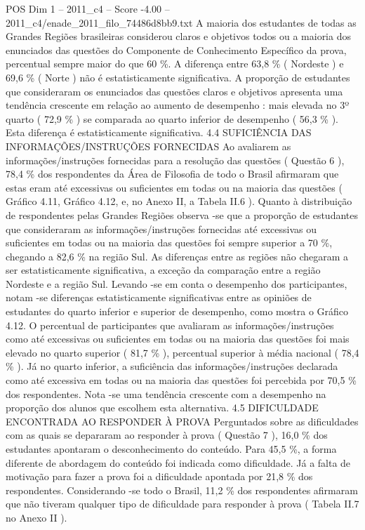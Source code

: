 \begin{textsample}{POS Dim 1 – 2011\_c4 – Score -4.00 – 2011\_c4/enade\_2011\_filo\_74486d8bb9.txt}
A maioria dos estudantes de todas as Grandes Regiões brasileiras considerou claros e objetivos todos ou a maioria dos enunciados das questões do Componente de Conhecimento Específico da prova, percentual sempre maior do que 60 \%.
A diferença entre 63,8 \% ( Nordeste ) e 69,6 \% ( Norte ) não é estatisticamente significativa.
A proporção de estudantes que consideraram os enunciados das questões claros e objetivos apresenta uma tendência crescente em relação ao aumento de desempenho : mais elevada no 3º quarto ( 72,9 \% ) se comparada ao quarto inferior de desempenho ( 56,3 \% ).
Esta diferença é estatisticamente significativa. 4.4 SUFICIÊNCIA DAS INFORMAÇÕES/INSTRUÇÕES FORNECIDAS Ao avaliarem as informações/instruções fornecidas para a resolução das questões ( Questão 6 ), 78,4 \% dos respondentes da Área de Filosofia de todo o Brasil afirmaram que estas eram até excessivas ou suficientes em todas ou na maioria das questões ( Gráfico 4.11, Gráfico 4.12, e, no Anexo II, a Tabela II.6 ).
Quanto à distribuição de respondentes pelas Grandes Regiões observa -se que a proporção de estudantes que consideraram as informações/instruções fornecidas até excessivas ou suficientes em todas ou na maioria das questões foi sempre superior a 70 \%, chegando a 82,6 \% na região Sul.
As diferenças entre as regiões não chegaram a ser estatisticamente significativa, a exceção da comparação entre a região Nordeste e a região Sul.
Levando -se em conta o desempenho dos participantes, notam -se diferenças estatisticamente significativas entre as opiniões de estudantes do quarto inferior e superior de desempenho, como mostra o Gráfico 4.12.
O percentual de participantes que avaliaram as informações/instruções como até excessivas ou suficientes em todas ou na maioria das questões foi mais elevado no quarto superior ( 81,7 \% ), percentual superior à média nacional ( 78,4 \% ).
Já no quarto inferior, a suficiência das informações/instruções declarada como até excessiva em todas ou na maioria das questões foi percebida por 70,5 \% dos respondentes.
Nota -se uma tendência crescente com a desempenho na proporção dos alunos que escolhem esta alternativa. 4.5 DIFICULDADE ENCONTRADA AO RESPONDER À PROVA Perguntados sobre as dificuldades com as quais se depararam ao responder à prova ( Questão 7 ), 16,0 \% dos estudantes apontaram o desconhecimento do conteúdo.
Para 45,5 \%, a forma diferente de abordagem do conteúdo foi indicada como dificuldade.
Já a falta de motivação para fazer a prova foi a dificuldade apontada por 21,8 \% dos respondentes.
Considerando -se todo o Brasil, 11,2 \% dos respondentes afirmaram que não tiveram qualquer tipo de dificuldade para responder à prova ( Tabela II.7 no Anexo II ).

\end{textsample}
